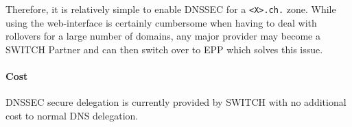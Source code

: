 \documentclass[a4paper,twocolumn]{scrartcl}
\begin{document}
Therefore, it is relatively simple to enable DNSSEC for a \verb|<X>.ch.| 
zone. While using the web-interface is certainly cumbersome when
having to deal with rollovers for a large number of domains, any major
provider may become a SWITCH Partner and can then switch over to EPP
which solves this issue.


\paragraph{Cost} DNSSEC secure delegation is currently provided by
SWITCH with no additional cost to normal DNS delegation.

\nocite{*}


\end{document}
